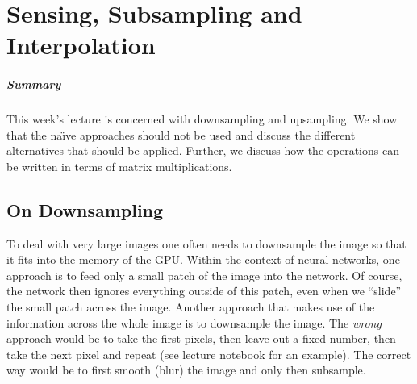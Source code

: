 \chapter{Sensing, Subsampling and Interpolation}%
\label{chap:02}
\paragraph{Summary} This week's lecture is concerned with downsampling and
upsampling. We show that the na\"\i{}ve approaches should not be used and
discuss the different alternatives that should be applied. Further, we discuss
how the operations can be written in terms of matrix multiplications.

\section{On Downsampling}
To deal with very large images one often needs to downsample the image so that
it fits into the memory of the GPU. Within the context of neural networks, one
approach is to feed only a small patch of the image into the network. Of course,
the network then ignores everything outside of this patch, even when we
``slide'' the small patch across the image. Another approach that makes use of
the information across the whole image is to downsample the image. The
\emph{wrong} approach would be to take the first pixels, then leave out a fixed
number, then take the next pixel and repeat (see lecture notebook for an
example). The correct way would be to first smooth (blur) the image and only
then subsample.

